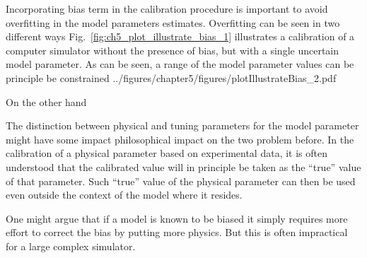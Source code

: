 Incorporating bias term in the calibration procedure is important to avoid overfitting in the model parameters estimates.
Overfitting can be seen in two different ways
Fig.~\ref{fig:ch5_plot_illustrate_bias_1} illustrates a calibration of a computer simulator without the presence of bias, but with a single uncertain model parameter.
As can be seen, a range of the model parameter values can be principle be constrained 
{../figures/chapter5/figures/plotIllustrateBias_2.pdf}

On the other hand

The distinction between physical and tuning parameters for the model parameter might have some impact philosophical impact on the two problem before.
In the calibration of a physical parameter based on experimental data,
it is often understood that the calibrated value will in principle be taken as the ``true'' value of that parameter.
Such ``true'' value of the physical parameter can then be used even outside the context of the model where it resides.

One might argue that if a model is known to be biased it simply requires more effort to correct the bias by putting more physics.
But this is often impractical for a large complex simulator.


